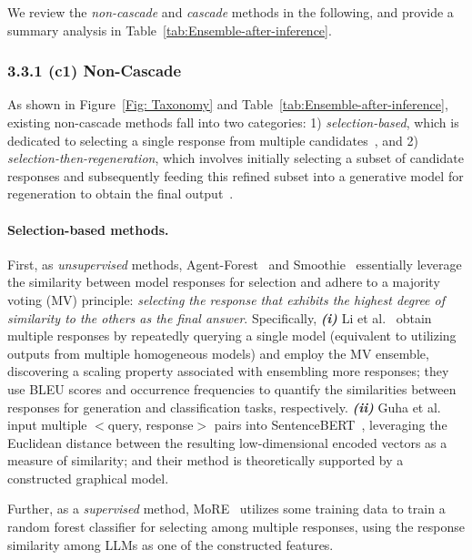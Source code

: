 \documentclass{article}
\begin{document}
We review the \textit{non-cascade} and \textit{cascade} methods in the following, and provide a summary analysis in Table~\ref{tab:Ensemble-after-inference}.


\subsubsection{3.3.1 (c1) Non-Cascade}

As shown in Figure~\ref{Fig: Taxonomy} and Table~\ref{tab:Ensemble-after-inference}, existing non-cascade methods fall into two categories: 1) \textit{selection-based}, which is dedicated to selecting a single response from multiple candidates~\cite{li2024more,guhasmoothie,si2023getting}, and 2) \textit{selection-then-regeneration}, which involves initially selecting a subset of candidate responses and subsequently feeding this refined subset into a generative model for regeneration to obtain the final output~\cite{jiang2023llm,tekin2024llm,lv2024urg}.





\paragraph{Selection-based methods.}
First, as \textit{unsupervised} methods, Agent-Forest~\cite{li2024more}  and Smoothie~\cite{guhasmoothie}  essentially leverage the similarity between model responses for selection and adhere to a majority voting (MV) principle:
\textit{selecting the response that exhibits the highest degree of similarity to the others as the final answer}. 
Specifically, \textbf{\textit{(i)}}
Li et al.~ obtain multiple responses by repeatedly querying a single model (equivalent to utilizing outputs from multiple homogeneous models) and employ the MV ensemble, discovering a scaling property associated with ensembling more responses; they use BLEU scores and occurrence frequencies to quantify the similarities between responses for generation and classification tasks, respectively.
\textbf{\textit{(ii)}}
Guha et al. ~ input multiple $<$query, response$>$ pairs into  SentenceBERT~\cite{reimers2019sentence}, leveraging the Euclidean distance between the resulting low-dimensional encoded vectors as a measure of similarity; and their method is theoretically supported by a constructed graphical model.


Further, as a \textit{supervised} method, MoRE~\cite{si2023getting} utilizes some training data to train a random forest classifier for selecting among multiple responses, using the response similarity among LLMs as one of the constructed features.
\end{document}
